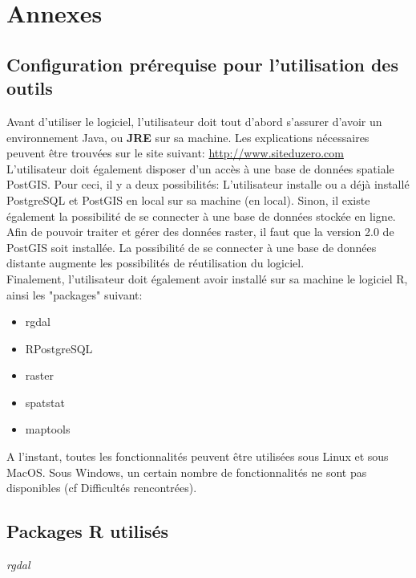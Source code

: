 \chapter{Annexes}


\section{Configuration prérequise pour l'utilisation des outils }

Avant d'utiliser le logiciel, l'utilisateur doit tout d'abord s'assurer d'avoir un environnement Java, ou \textbf{JRE} sur sa machine. Les explications nécessaires peuvent être trouvées sur le site suivant: \url{http://www.siteduzero.com} \\

L'utilisateur doit également disposer d'un accès à une base de données spatiale PostGIS. Pour ceci, il y a deux possibilités: L'utilisateur installe ou a déjà installé PostgreSQL et PostGIS en local sur sa machine (en local). Sinon, il existe également la possibilité de se connecter à une base de données stockée en ligne. Afin de pouvoir traiter et gérer des données raster, il faut que la version 2.0 de PostGIS soit installée. La possibilité de se connecter à une base de données distante augmente les possibilités de réutilisation du logiciel.\\

Finalement, l'utilisateur doit également avoir installé sur sa machine le logiciel R, ainsi les "packages" suivant: \\
\begin{itemize}
\item rgdal
\item RPostgreSQL
\item raster
\item spatstat
\item maptools
\end{itemize}

A l'instant, toutes les fonctionnalités peuvent être utilisées sous Linux et sous MacOS. Sous Windows, un certain nombre de fonctionnalités ne sont pas disponibles (cf Difficultés rencontrées).

\section{Packages R utilisés}



\textit{rgdal\\}

